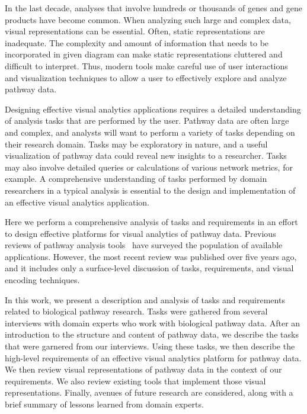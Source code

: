 \documentclass[review,journal]{vgtc}         %
\newcounter{task}
\newcounter{requirement}
\newcommand*{\p}[1]{\paragraph{\textbf{#1}}}
\begin{document}

In the last decade, analyses that involve hundreds or thousands of genes and gene products have become common. When analyzing such large and complex data, visual representations can be essential. Often, static representations are inadequate. The complexity and amount of information that needs to be incorporated in given diagram can make static representations cluttered and difficult to interpret. Thus, modern tools make careful use of user interactions and visualization techniques to allow a user to effectively explore and analyze pathway data.


Designing effective visual analytics applications requires a detailed understanding of analysis tasks that are performed by the user. Pathway data are often large and complex, and analysts will want to perform a variety of tasks depending on their research domain. Tasks may be exploratory in nature, and a useful visualization of pathway data could reveal new insights to a researcher. Tasks may also involve detailed queries or calculations of various network metrics, for example. A comprehensive understanding of tasks performed by domain researchers in a typical analysis is essential to the design and implementation of an effective visual analytics application.


Here we perform a comprehensive analysis of tasks and requirements in an effort to design effective platforms for visual analytics of pathway data. Previous reviews of pathway analysis tools~\cite{Gehlenborg2010omics,Suderman2007tools} have surveyed the population of available applications. However, the most recent review was published over five years ago, and it includes only a surface-level discussion of tasks, requirements, and visual encoding techniques.


In this work, we present a description and analysis of tasks and requirements related to biological pathway research. Tasks were gathered from several interviews with domain experts who work with biological pathway data. After an introduction to the structure and content of pathway data, we describe the tasks that were garnered from our interviews. Using these tasks, we then describe the high-level requirements of an effective visual analytics platform for pathway data. We then review visual representations of pathway data in the context of our requirements. We also review existing tools that implement those visual representations. Finally, avenues of future research are considered, along with a brief summary of lessons learned from domain experts.
\end{document}
